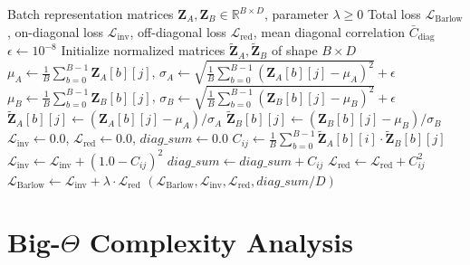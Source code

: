 \documentclass[11pt,a4paper]{article}
\theoremstyle{definition}
\begin{document}
\begin{algorithm}[H]
\caption{Barlow Twins Batch Standardization and Redundancy-Reduction Loss}
\begin{algorithmic}[1]
\Require Batch representation matrices $\mathbf{Z}_A, \mathbf{Z}_B \in \mathbb{R}^{B \times D}$, parameter $\lambda \ge 0$
\Ensure Total loss $\mathcal{L}_{\text{Barlow}}$, on-diagonal loss $\mathcal{L}_{\text{inv}}$, off-diagonal loss $\mathcal{L}_{\text{red}}$, mean diagonal correlation $\bar{C}_{\text{diag}}$
\State $\epsilon \gets 10^{-8}$
\State Initialize normalized matrices $\tilde{\mathbf{Z}}_A, \tilde{\mathbf{Z}}_B$ of shape $B \times D$
    \State $\mu_A \gets \frac{1}{B}\sum_{b=0}^{B-1} \mathbf{Z}_A[b][j]$, \quad $\sigma_A \gets \sqrt{\frac{1}{B}\sum_{b=0}^{B-1} (\mathbf{Z}_A[b][j] - \mu_A)^2} + \epsilon$
    \State $\mu_B \gets \frac{1}{B}\sum_{b=0}^{B-1} \mathbf{Z}_B[b][j]$, \quad $\sigma_B \gets \sqrt{\frac{1}{B}\sum_{b=0}^{B-1} (\mathbf{Z}_B[b][j] - \mu_B)^2} + \epsilon$
        \State $\tilde{\mathbf{Z}}_A[b][j] \gets (\mathbf{Z}_A[b][j] - \mu_A) / \sigma_A$
        \State $\tilde{\mathbf{Z}}_B[b][j] \gets (\mathbf{Z}_B[b][j] - \mu_B) / \sigma_B$
    \EndFor
\EndFor
\State $\mathcal{L}_{\text{inv}} \gets 0.0$, \quad $\mathcal{L}_{\text{red}} \gets 0.0$, \quad $diag\_sum \gets 0.0$
        \State $C_{ij} \gets \frac{1}{B}\sum_{b=0}^{B-1} \tilde{\mathbf{Z}}_A[b][i] \cdot \tilde{\mathbf{Z}}_B[b][j]$
            \State $\mathcal{L}_{\text{inv}} \gets \mathcal{L}_{\text{inv}} + (1.0 - C_{ij})^2$
            \State $diag\_sum \gets diag\_sum + C_{ij}$
        \Else
            \State $\mathcal{L}_{\text{red}} \gets \mathcal{L}_{\text{red}} + C_{ij}^2$
        \EndIf
    \EndFor
\EndFor
\State $\mathcal{L}_{\text{Barlow}} \gets \mathcal{L}_{\text{inv}} + \lambda \cdot \mathcal{L}_{\text{red}}$
\State \Return $(\mathcal{L}_{\text{Barlow}}, \mathcal{L}_{\text{inv}}, \mathcal{L}_{\text{red}}, diag\_sum / D)$
\end{algorithmic}
\end{algorithm}

\section{Big-$\Theta$ Complexity Analysis}
\end{document}
